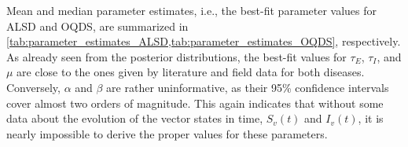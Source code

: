 Mean and median parameter estimates, i.e., the best-fit parameter values for
ALSD and OQDS, are summarized in
\cref{tab:parameter_estimates_ALSD,tab:parameter_estimates_OQDS}, respectively.
As already seen from the posterior distributions, the best-fit values for
$\tau_E$, $\tau_I$, and $\mu$ are close to the ones given by literature and
field data for both diseases. Conversely, $\alpha$ and $\beta$ are rather
uninformative, as their 95\% confidence intervals cover almost two orders of
magnitude. This again indicates that without some data about the evolution of
the vector states in time, $S_v(t)$ and $I_v(t)$, it is nearly impossible to
derive the proper values for these parameters.

\begin{table}[H]
    \centering
    \caption[Estimated parameters of the model for ALSD in Mallorca]{Estimated
        epidemiological
        parameters from Bayesian model
        fitting to the disease progression curve of ALSD in Mallorca.}
    \label{tab:parameter_estimates_ALSD}
\end{table}

